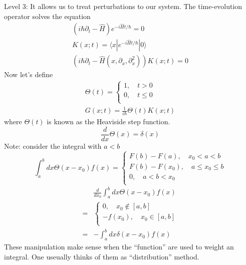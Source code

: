 Level 3: It allows us to treat perturbations to our system. The time-evolution operator solves the equation
\begin{gather*}
    \left( i\hbar \partial _t-\hat{H} \right) e^{-i\hat{H}t/\hbar}=0\\
    K\left( x;t \right) =\langle x|e^{-i\hat{H}t/\hbar}|0\rangle \\
    \left( i\hbar \partial _t-\hat{H}\left( x,\partial _x,\partial _{x}^{2} \right) \right) K\left( x;t \right) =0
\end{gather*}
Now let's define
\begin{gather*}
    \Theta \left( t \right) =\begin{cases}
        1,\quad t>0\\
        0,\quad t\le 0\\
    \end{cases}\\
    G\left( x;t \right) =\frac{1}{i\hbar}\Theta \left( t \right) K\left( x;t \right)
\end{gather*}
where $\Theta(t)$ is known as the Heaviside step function.
\[ \frac{d}{dx}\Theta \left( x \right) =\delta \left( x \right) \]
Note: consider the integral with $a<b$
\[ \int_a^b{dx\Theta \left( x-x_0 \right) f\left( x \right)}=\begin{cases}
	F\left( b \right) -F\left( a \right) ,\quad x_0<a<b\\
	F\left( b \right) -F\left( x_0 \right) ,\quad a\le x_0\le b\\
	0,\quad a<b<x_0\\
\end{cases}\]
\begin{align*}
    &\frac{d}{dx_0}\int_a^b{dx\Theta \left( x-x_0 \right) f\left( x \right)}\\
    =&\begin{cases}
        0,\quad x_0\notin \left[ a,b \right]\\
        -f\left( x_0 \right) ,\quad x_0\in \left[ a,b \right]\\
    \end{cases}\\
    =&-\int_a^b{dx\delta \left( x-x_0 \right) f\left( x \right)}
\end{align*}
These manipulation make sense when the ``function'' are used to weight an integral. One useually thinks of them as ``distribution'' method.

